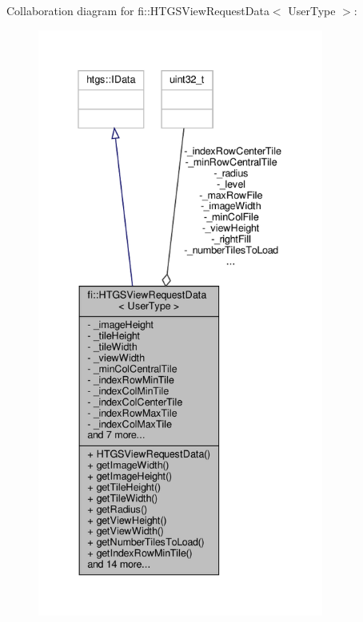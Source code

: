 Collaboration diagram for fi\+:\+:H\+T\+G\+S\+View\+Request\+Data$<$ User\+Type $>$\+:
\nopagebreak
\begin{figure}[H]
\begin{center}
\leavevmode
\includegraphics[height=550pt]{d9/da9/classfi_1_1HTGSViewRequestData__coll__graph}
\end{center}
\end{figure}
